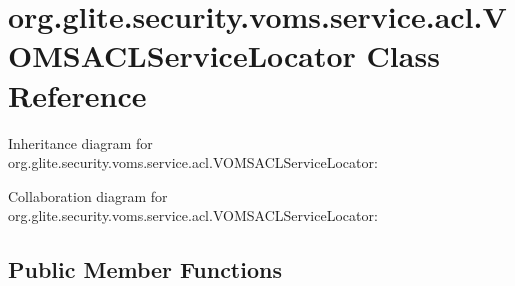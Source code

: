 \hypertarget{classorg_1_1glite_1_1security_1_1voms_1_1service_1_1acl_1_1VOMSACLServiceLocator}{
\section{org.glite.security.voms.service.acl.VOMSACLServiceLocator Class Reference}
\label{classorg_1_1glite_1_1security_1_1voms_1_1service_1_1acl_1_1VOMSACLServiceLocator}
}


Inheritance diagram for org.glite.security.voms.service.acl.VOMSACLServiceLocator:


Collaboration diagram for org.glite.security.voms.service.acl.VOMSACLServiceLocator:
\subsection*{Public Member Functions}
